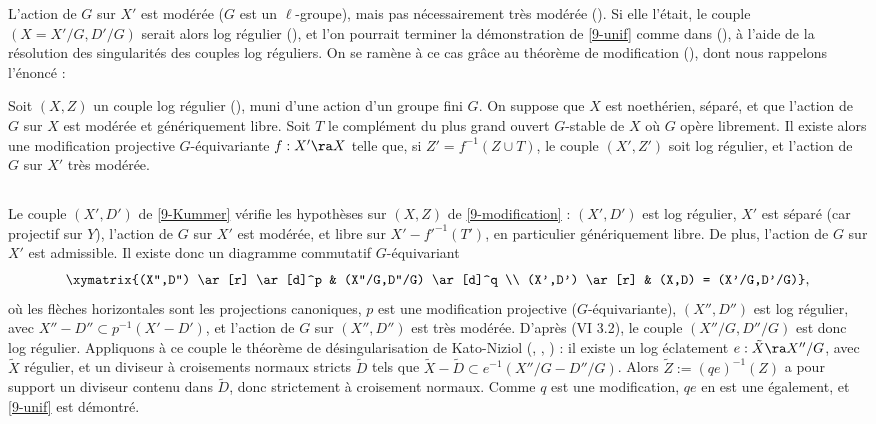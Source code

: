 \documentclass[10pt]{../fichiers-configuration-latex/smfart}
\begin{document}
L'action de $G$ sur $X'$ est modérée ($G$ est un $\ell$-groupe), mais pas nécessairement très
modérée (). Si elle l'était, le couple $(X = X'/G, D'/G)$ serait alors log
régulier (), et l'on pourrait terminer la démonstration de \ref{9-unif}
comme dans (), à l'aide de la résolution des singularités
des couples log réguliers.  On se ramène à ce cas grâce au théorème de modification
(), dont nous rappelons l'énoncé :
\begin{theoreme}\label{9-modification} Soit $(X,Z)$ un couple log régulier (),
muni d'une action d'un groupe fini $G$. On suppose que $X$ est noethérien, séparé, et que l'action
de $G$ sur $X$ est modérée et génériquement libre. Soit $T$ le complément du plus  grand ouvert
$G$-stable de $X$ où $G$ opère librement. Il existe alors une modification projective
$G$-équivariante $f : X' \ra X$ telle que, si $Z' = f^{-1}(Z \cup T)$, le couple $(X',Z')$ soit log
régulier, et l'action de $G$ sur $X'$ très modérée.  \end{theoreme} \subsection{}\label{9-fin} Le
couple $(X',D')$ de \ref{9-Kummer} vérifie les hypothèses sur $(X,Z)$ de \ref{9-modification} :
$(X',D')$ est log régulier, $X'$ est séparé (car projectif sur $Y$), l'action de $G$ sur $X'$ est
modérée, et libre sur $X'-f'^{-1}(T')$, en particulier génériquement libre. De plus, l'action de $G$
sur $X'$ est admissible. Il existe donc un diagramme commutatif $G$-équivariant $$
\xymatrix{(X'',D'') \ar[r] \ar[d]^p & (X''/G,D''/G) \ar[d]^q \\ (X',D') \ar[r] & (X,D) =
(X'/G,D'/G)}, $$ où les flèches horizontales sont les projections canoniques, $p$ est une
modification projective ($G$-équivariante), $(X'',D'')$ est log régulier, avec $X'' - D'' \subset
p^{-1}(X'-D')$, et l'action de $G$ sur $(X'',D'')$ est très modérée. D'après (VI 3.2), le couple
$(X''/G,D''/G)$ est donc log régulier. Appliquons à ce couple le théorème de désingularisation de
Kato-Niziol (\cite[10.3, 10.4]{Toric@Kato}, \cite[5.7]{Toric@Niziol}, \cite[4.5]{HT@GR}) : il existe
un log éclatement $e : \tilde X \ra X''/G$, avec $\tilde X$ régulier, et un diviseur à croisements
normaux stricts $\tilde D$ tels que $\tilde X - \tilde D \subset e^{-1}(X''/G - D''/G)$. Alors
$\tilde Z := (qe)^{-1}(Z)$ a pour support un diviseur contenu dans $\tilde D$, donc strictement à
croisement normaux. Comme $q$ est une modification, $qe$ en est une également, et \ref{9-unif} est
démontré.

\ifx\danslelivre\undefined


\end{document}
